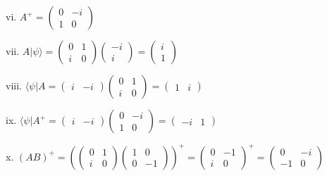 \documentclass[12pt]{article}
\begin{document}
\begin{spacing}{2.0}
vi. $A^{+}= \left(
\begin{array}{cc}
0 & -i\\
1 & 0
\end{array}
\right)$

vii. $A|\psi\rangle= \left(
\begin{array}{cc}
0 & 1\\
i & 0
\end{array}
\right)\left(\begin{array}{c}
-i\\
i
\end{array}
\right)=\left(\begin{array}{c}
i\\
1
\end{array}
\right)$

viii. $\langle \psi|A= \left(
\begin{array}{cc}
i & -i
\end{array}
\right)\left(
\begin{array}{cc}
0 & 1\\
i & 0
\end{array}
\right)=\left(
\begin{array}{cc}
1 & i
\end{array}
\right)$

ix. $\langle \psi|A^{+} = \left(
\begin{array}{cc}
i & -i
\end{array}
\right)\left(
\begin{array}{cc}
0 & -i\\
1 & 0
\end{array}
\right)= \left(
\begin{array}{cc}
-i & 1
\end{array}
\right)$

x. $(AB)^{+}= \left(\left(
\begin{array}{cc}
0 & 1\\
i & 0
\end{array}
\right)\left(
\begin{array}{cc}
1 & 0\\
0 & -1
\end{array}
\right) \right)^{+}= \left(
\begin{array}{cc}
0 & -1\\
i & 0
\end{array}
\right)^{+}= \left(
\begin{array}{cc}
0 & -i\\
-1 & 0
\end{array}
\right)$


\end{spacing}
\end{document}
